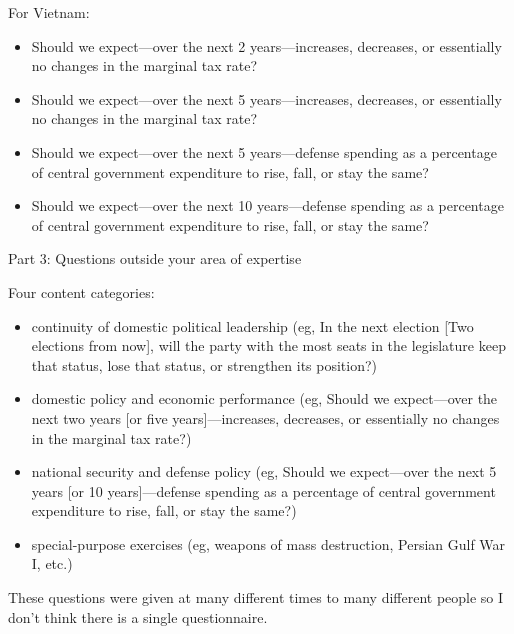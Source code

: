 \documentclass[aspectratio=169]{beamer}
\begin{document}
\begin{frame}

For Vietnam:
\begin{itemize}
\item Should we expect---over the next 2 years---increases, decreases, or essentially no changes in the marginal tax rate?
\item Should we expect---over the next 5 years---increases, decreases, or essentially no changes in the marginal tax rate?
\item Should we expect---over the next 5 years---defense spending as a percentage of central government expenditure to rise, fall, or stay the same?
\item Should we expect---over the next 10 years---defense spending as a percentage of central government expenditure to rise, fall, or stay the same?
\end{itemize}

\end{frame}
\begin{frame}

Part 3: Questions outside your area of expertise

\end{frame}
\begin{frame}

Four content categories:
\begin{itemize}
\item continuity of domestic political leadership (eg, In the next election [Two elections from now], will the party with the most seats in the legislature keep that status, lose that status, or strengthen its position?)
\pause
\item domestic policy and economic performance (eg, Should we expect---over the next two years [or five years]---increases, decreases, or essentially no changes in the marginal tax rate?)
\pause
\item national security and defense policy (eg, Should we expect---over the next 5 years [or 10 years]---defense spending as a percentage of central government expenditure to rise, fall, or stay the same?)
\pause
\item special-purpose exercises (eg, weapons of mass destruction, Persian Gulf War I, etc.)
\end{itemize}

\pause
These questions were given at many different times to many different people so I don't think there is a single questionnaire.

\end{frame}
\end{document}
